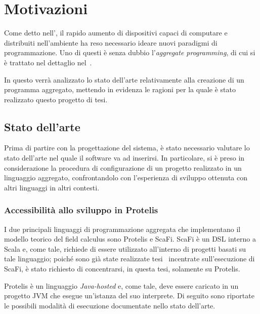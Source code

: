 \chapter{Motivazioni}\label{ch:motivations}

  Come detto nell', il rapido aumento di dispositivi capaci di computare e distribuiti nell'ambiente ha reso necessario ideare nuovi paradigmi di programmazione.
  Uno di questi è senza dubbio l'\emph{aggregate programming}, di cui si è trattato nel dettaglio nel~.

  In questo  verrà analizzato lo stato dell'arte relativamente alla creazione di un programma aggregato,
  mettendo in evidenza le ragioni per la quale è stato realizzato questo progetto di tesi.

  \section{Stato dell'arte}\label{sec:state-of-art}

  Prima di partire con la progettazione del sistema, è stato necessario valutare lo stato dell'arte nel quale il software va ad inserirsi.
  In particolare, si è preso in considerazione la procedura di configurazione di un progetto realizzato in un linguaggio aggregato,
  confrontandolo con l'esperienza di sviluppo ottenuta con altri linguaggi in altri contesti.

  \subsection{Accessibilità allo sviluppo in Protelis}\label{subsec:setup}

  I due principali linguaggi di programmazione aggregata che implementano il modello teorico del field calculus sono Protelis e ScaFi.
  ScaFi è un DSL interno a Scala e, come tale, richiede di essere utilizzato all'interno di progetti basati su tale linguaggio;
  poiché sono già state realizzate tesi~\cite{amslaurea12188,amslaurea16824} incentrate sull'esecuzione di ScaFi,
  è stato richiesto di concentrarsi, in questa tesi, solamente su Protelis.

  Protelis è un linguaggio \emph{Java-hosted} e, come tale, deve essere caricato in un progetto JVM che esegue un'istanza del suo interprete.
  Di seguito sono riportate le possibili modalità di esecuzione documentate nello stato dell'arte.

